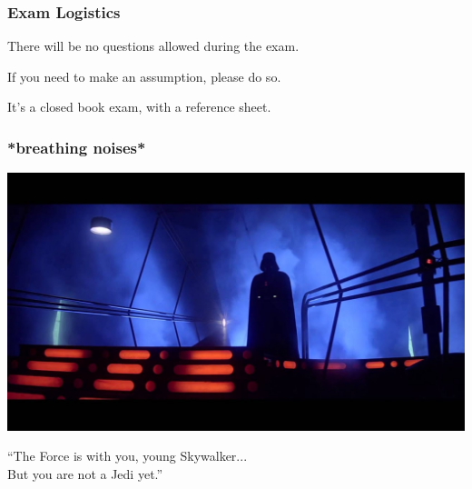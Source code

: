 \begin{frame}
\frametitle{Exam Logistics}
There will be no questions allowed during the exam.

If you need to make an assumption, please do so. 

It's a closed book exam, with a reference sheet.


\end{frame}



\begin{frame}
\frametitle{*breathing noises*}

\begin{center}
	\includegraphics[width=\textwidth]{images/vader.jpg}
\end{center}

``The Force is with you, young Skywalker...\\
\quad But you are not a Jedi yet.''


\end{frame}




